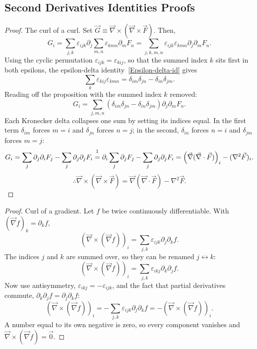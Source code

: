 \documentclass{article}
\begin{document}
\subsection{Second Derivatives Identities Proofs}
\label{proof:sdip}
\begin{proof}
    The curl of a curl. Set $\vec{G} \equiv \vec{\nabla}\times(\vec{\nabla}\times\vec{F})$. Then,
    \[G_i = \sum_{j,k}\varepsilon_{ijk}\partial_j\sum_{m,n} \varepsilon_{kmn}\partial_m F_n=\sum_{j,k,m,n}\varepsilon_{ijk}\varepsilon_{kmn}\partial_j\partial_mF_n.\]
    Using the cyclic permutation $\varepsilon_{ijk} = \varepsilon_{kij}$, so that the summed index $k$ sits first in both epsilons, the epsilon-delta identity~\ref{Epsilon-delta-id} gives
    \[\sum_k \varepsilon_{kij}\varepsilon_{kmn} = \delta_{im}\delta_{jn} - \delta_{in}\delta_{jm}.\]
    Reading off the proposition with the summed index $k$ removed:
    \[G_i = \sum_{j,m,n}\left(\delta_{im}\delta_{jn} - \delta_{in}\delta_{jm}\right)\partial_j\partial_m F_n.\]
    Each Kronecker delta collapses one sum by setting its indices equal. In the first term $\delta_{im}$ forces $m = i$ and $\delta_{jn}$ forces $n = j$; in the second, $\delta_{in}$ forces $n = i$ and $\delta_{jm}$ forces $m = j$:
    \[G_i = \sum_j \partial_j\partial_i F_j - \sum_j \partial_j\partial_j F_i \overset{\footnotemark}{=} \partial_i\sum_j\partial_j F_j - \sum_j \partial_j\partial_j F_i = \left(\vec{\nabla}(\vec{\nabla}\cdot\vec{F})\right)_i - (\nabla^2\vec{F})_i.\]
    \[\therefore \vec{\nabla}\times(\vec{\nabla}\times\vec{F}) = \vec{\nabla}(\vec{\nabla}\cdot\vec{F}) - \nabla^2\vec{F}.\]
\end{proof}
\begin{proof}
    Curl of a gradient. Let $f$ be twice continuously differentiable. With $(\vec{\nabla}f)_k = \partial_k f$,
    \[\left(\vec{\nabla}\times(\vec{\nabla}f)\right)_i = \sum_{j,k}\varepsilon_{ijk}\partial_j\partial_k f.\]
    The indices $j$ and $k$ are summed over, so they can be renamed $j \leftrightarrow k$:
    \[\left(\vec{\nabla}\times(\vec{\nabla}f)\right)_i = \sum_{j,k}\varepsilon_{ikj}\partial_k\partial_j f.\]
    Now use antisymmetry, $\varepsilon_{ikj} = -\varepsilon_{ijk}$, and the fact that partial derivatives commute, $\partial_k\partial_j f = \partial_j\partial_k f$:
    \[\left(\vec{\nabla}\times(\vec{\nabla}f)\right)_i = -\sum_{j,k}\varepsilon_{ijk}\partial_j\partial_k f = -\left(\vec{\nabla}\times(\vec{\nabla}f)\right)_i.\]
    A number equal to its own negative is zero, so every component vanishes and $\vec{\nabla}\times(\vec{\nabla}f) = \vec{0}$.
\end{proof}
\end{document}

